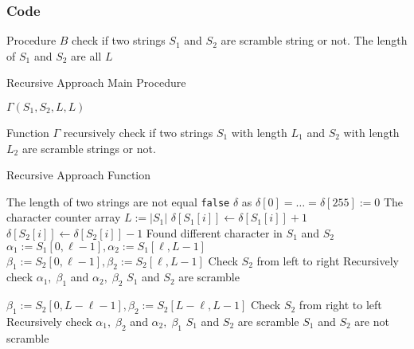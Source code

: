 \subsubsection{Code}
Procedure $B$ check if two strings $S_1$ and $S_2$ are scramble string or not. The length of $S_1$ and $S_2$ are all $L$
\setcounter{algorithm}{0}
\begin{algorithm}[H]
\caption{Recursive Approach Main Procedure}
\begin{algorithmic}[1]
\State \Return $\Gamma(S_1, S_2, L, L)$
\EndProcedure
\end{algorithmic}
\end{algorithm}
Function $\Gamma$ recursively check if two strings $S_1$ with length $L_1$ and $S_2$ with length $L_2$ are scramble strings or not.
\begin{algorithm}[H]
\caption{Recursive Approach Function}
\begin{algorithmic}[1]
 \Comment The length of two strings are not equal
\State {} \Comment \texttt{false}
\EndIf
\State $\delta$ as $\delta[0]=\ldots=\delta[255]:=0$ The character counter array
\State $L := |S_1|$
\State $\delta[S_1[i]]\gets \delta[S_1[i]] + 1$
\State $\delta[S_2[i]]\gets \delta[S_2[i]] - 1$
\EndFor
{}
\State {} \Comment Found different character in $S_1$ and $S_2$
\EndIf
\EndFor
{}
\State $\alpha_1:=S_1[0,\ell-1], \alpha_2:=S_1[\ell, L-1]$
\State $\beta_1:=S_2[0,\ell-1], \beta_2:=S_2[\ell, L-1]$ \Comment Check $S_2$ from left to right
 \Comment Recursively check $\alpha_1,\;\beta_1$ and $\alpha_2,\;\beta_2$
\State {} \Comment $S_1$ and $S_2$ are scramble
\EndIf
{}
\end{algorithmic}
\end{algorithm}
\begin{algorithm}[H]
\begin{algorithmic}[1]
\State $\beta_1:=S_2[0,L-\ell-1], \beta_2:=S_2[L-\ell, L-1]$ \Comment Check $S_2$ from right to left
 \Comment Recursively check $\alpha_1,\;\beta_2$ and $\alpha_2,\;\beta_1$
\State {} \Comment $S_1$ and $S_2$ are scramble
\EndIf
\EndFor
\State {} \Comment $S_1$ and $S_2$ are not scramble
\EndFunction
\end{algorithmic}
\end{algorithm}
